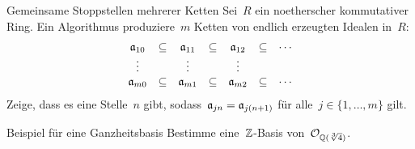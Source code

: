 \documentclass{algblatt}
\begin{document}
\begin{aufgabe}{3}{Gemeinsame Stoppstellen mehrerer Ketten}
Sei~$R$ ein noetherscher kommutativer Ring. Ein Algorithmus produziere~$m$
Ketten von endlich erzeugten Idealen in~$R$:
\[ \begin{array}{@{}ccccccc@{}}
  \aa_{10} &\subseteq& \aa_{11} &\subseteq& \aa_{12} &\subseteq& \cdots \\
  \vdots &         & \vdots &         & \vdots &          \\
  \aa_{m0} &\subseteq& \aa_{m1} &\subseteq& \aa_{m2} &\subseteq& \cdots
\end{array} \]
Zeige, dass es eine Stelle~$n$ gibt, sodass~$\aa_{jn} = \aa_{j(n+1)}$ für alle~$j \in
\{ 1,\ldots,m \}$ gilt.
\end{aufgabe}

\enlargethispage{1cm}

\begin{aufgabe}{4}{Beispiel für eine Ganzheitsbasis}
Bestimme eine~$\ZZ$-Basis von~$\O_{\QQ(\sqrt[3]{4})}$.
\end{aufgabe}
\end{document}
